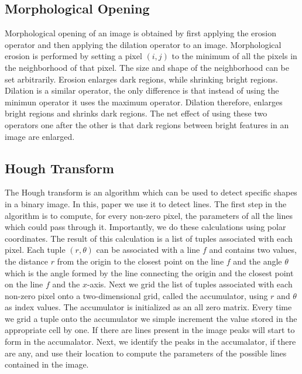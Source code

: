 \documentclass{article}
\begin{document}
\subsection{Morphological Opening}
Morphological opening of an image is obtained by first applying the erosion operator and then applying the dilation operator to an image. 
Morphological erosion is performed by setting a pixel $(i,j)$ to the minimum of all the pixels in the neighborhood of that pixel. The size 
and shape of the neighborhood can be set arbitrarily. Erosion enlarges dark regions, while shrinking bright regions. Dilation is a similar operator,
the only difference is that instead of using the minimun operator it uses the maximum operator. Dilation therefore, enlarges bright regions and shrinks dark regions.
The net effect of using these two operators one after the other is that dark regions between bright features in an image are enlarged. 

\subsection{Hough Transform}
The Hough transform is an algorithm which can be used to detect specific shapes in a binary image. In this, paper we use it to detect lines. 
The first step in the algorithm is to compute, for every non-zero pixel, the parameters of all the lines which could pass through it. Importantly, we do these calculations using polar coordinates. 
The result of this calculation is a list of tuples associated with each pixel. Each tuple $(r,\theta)$ can be associated with a line $f$ and contains two values, 
the distance $r$ from the origin to the closest point on the line $f$ and the angle $\theta$ which is the angle formed by the line 
connecting the origin and the closest point on the line $f$ and the $x$-axis. Next we grid the list of tuples associated with each non-zero pixel onto a two-dimensional 
grid, called the accumulator, using $r$ and $\theta$ as index values. The accumulator is initialized as an all zero matrix. Every time we grid a tuple onto the accumulator 
we simple increment the value stored in the appropriate cell by one. If there are lines present in the image peaks will start to form in the accumalator. Next, we 
identify the peaks in the accumalator, if there are any, and use their location to compute the parameters of the possible lines contained in the image. 
\end{document}
